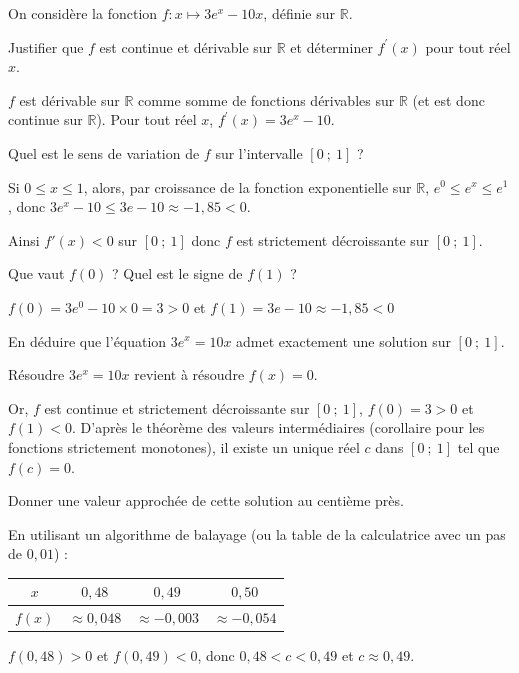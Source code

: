 \documentclass[11pt,a4paper]{article}  %
\begin{document}
On considère la fonction $f: x \mapsto 3e^x-10x$, définie sur $\mathbb{R}$.
\begin{enumMet}
	\item Justifier que $f$ est continue et dérivable sur $\mathbb{R}$ et déterminer $f^{\prime}(x)$ pour tout réel $x$.
	\begin{corrBox}
		$f$ est dérivable sur $\mathbb{R}$ comme somme de fonctions dérivables sur $\mathbb{R}$ (et est donc continue sur $\mathbb{R}$). Pour tout réel $x$, $f^{\prime}(x)=3e^x-10$.
	\end{corrBox}
	\item Quel est le sens de variation de $f$ sur l'intervalle $[0\ ;\ 1]$ ?
	\begin{corrBox}
		Si $0 \leqslant x \leqslant 1$, alors, par croissance de la fonction exponentielle sur $\mathbb{R}$, $e^0 \leqslant e^x \leqslant e^1$, donc $3e^x-10 \leqslant 3e-10\approx -1{,}85<0$.

		Ainsi $f'(x)<0$ sur $[0\ ;\ 1]$ donc $f$ est strictement décroissante sur $[0\ ;\ 1]$.
	\end{corrBox}
	\item Que vaut $f(0)$ ? Quel est le signe de $f(1)$ ?
	\begin{corrBox}
		$f(0)=3e^0-10\times 0=3>0$ et $f(1)=3e-10\approx -1{,}85<0$
	\end{corrBox}
	\item En déduire que l'équation $3e^x=10x$ admet exactement une solution sur $[0\ ;\ 1]$.
	\begin{corrBox}
		Résoudre $3e^x=10x$ revient à résoudre $f(x)=0$.

		Or, $f$ est continue et strictement décroissante sur $[0\ ;\ 1]$, $f(0)=3>0$ et $f(1)<0$. D'après le théorème des valeurs intermédiaires (corollaire pour les fonctions strictement monotones), il existe un unique réel $c$ dans $[0\ ;\ 1]$ tel que $f(c)=0$.
	\end{corrBox}
	\item Donner une valeur approchée de cette solution au centième près.
	\begin{corrBox}
		En utilisant un algorithme de balayage (ou la table de la calculatrice avec un pas de $0{,}01$) :

		\begin{center}
			\begin{tabular}{|c|c|c|c|}
				\hline
				$x$ & $0{,}48$ & $0{,}49$ & $0{,}50$ \\ \hline
				$f(x)$ & $\approx 0{,}048$ & $\approx -0{,}003$ & $\approx -0{,}054$ \\ \hline
			\end{tabular}
		\end{center}

		$f(0{,}48)>0$ et $f(0{,}49)<0$, donc $0{,}48<c<0{,}49$ et $c \approx 0{,}49$.
	\end{corrBox}
\end{enumMet}
\end{document}
